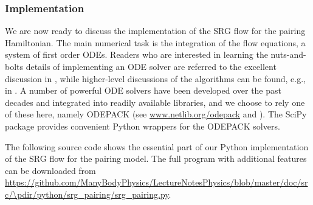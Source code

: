 \subsubsection{\label{sec:srg_pairing_implementation}Implementation}
We are now ready to discuss the implementation of the SRG flow for the pairing
Hamiltonian. The main numerical task is the integration of the flow equations,
a system of first order ODEs. Readers who are interested in learning the 
nuts-and-bolts details of implementing an ODE solver are referred to the excellent 
discussion in \cite{Press:2007vn}, while higher-level discussions of the algorithms
can be found, e.g., in \cite{Shampine:1975qq,Landau:2012zr,Hjorth-Jensen:2015mz}.
A number of powerful ODE solvers have been developed over the past decades and 
integrated into readily available libraries, and we choose to rely one of these 
here, namely ODEPACK (see \url{www.netlib.org/odepack} and 
\cite{Hindmarsh:1983pd,Radhakrishnan:1993fk,Brown:1989qd}). The SciPy package
provides convenient Python wrappers for the ODEPACK solvers.

The following source code shows the essential part of our Python implementation of
the SRG flow for the pairing model. The full program with additional features can 
be downloaded from 
\url{https://github.com/ManyBodyPhysics/LectureNotesPhysics/blob/master/doc/src/\pdir/python/srg_pairing/srg_pairing.py}.


